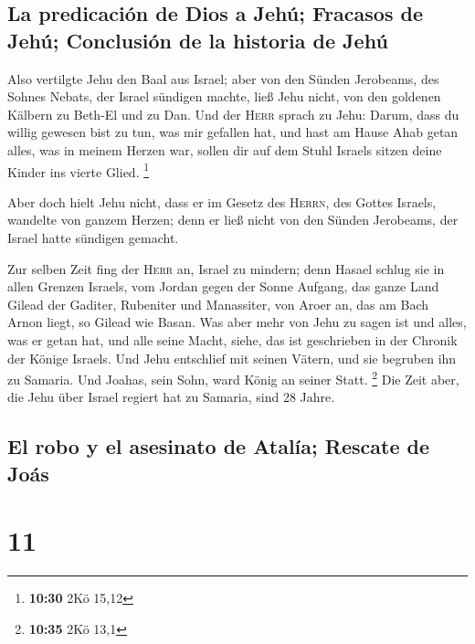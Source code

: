 \hypertarget{la-predicaciuxf3n-de-dios-a-jehuxfa-fracasos-de-jehuxfa-conclusiuxf3n-de-la-historia-de-jehuxfa}{%
\subsection{La predicación de Dios a Jehú; Fracasos de Jehú; Conclusión
de la historia de
Jehú}\label{la-predicaciuxf3n-de-dios-a-jehuxfa-fracasos-de-jehuxfa-conclusiuxf3n-de-la-historia-de-jehuxfa}}

 Also vertilgte Jehu den Baal aus Israel; 
aber von den Sünden Jerobeams, des Sohnes Nebats, der Israel sündigen
machte, ließ Jehu nicht, von den goldenen Kälbern zu Beth-El und zu Dan.
 Und der \textsc{Herr} sprach zu Jehu: Darum, dass du
willig gewesen bist zu tun, was mir gefallen hat, und hast am Hause Ahab
getan alles, was in meinem Herzen war, sollen dir auf dem Stuhl Israels
sitzen deine Kinder ins vierte Glied. \footnote{\textbf{10:30} 2Kö 15,12}

 Aber doch hielt Jehu nicht, dass er im Gesetz des
\textsc{Herrn}, des Gottes Israels, wandelte von ganzem Herzen; denn er
ließ nicht von den Sünden Jerobeams, der Israel hatte sündigen gemacht.

 Zur selben Zeit fing der \textsc{Herr} an, Israel zu
mindern; denn Hasael schlug sie in allen Grenzen Israels,
 vom Jordan gegen der Sonne Aufgang, das ganze Land
Gilead der Gaditer, Rubeniter und Manassiter, von Aroer an, das am Bach
Arnon liegt, so Gilead wie Basan.  Was aber mehr von Jehu
zu sagen ist und alles, was er getan hat, und alle seine Macht, siehe,
das ist geschrieben in der Chronik der Könige Israels. 
Und Jehu entschlief mit seinen Vätern, und sie begruben ihn zu Samaria.
Und Joahas, sein Sohn, ward König an seiner Statt. \footnote{\textbf{10:35}
  2Kö 13,1}  Die Zeit aber, die Jehu über Israel regiert
hat zu Samaria, sind 28 Jahre.

\hypertarget{el-robo-y-el-asesinato-de-ataluxeda-rescate-de-jouxe1s}{%
\subsection{El robo y el asesinato de Atalía; Rescate de
Joás}\label{el-robo-y-el-asesinato-de-ataluxeda-rescate-de-jouxe1s}}

\hypertarget{section-10}{%
\section{11}\label{section-10}}

